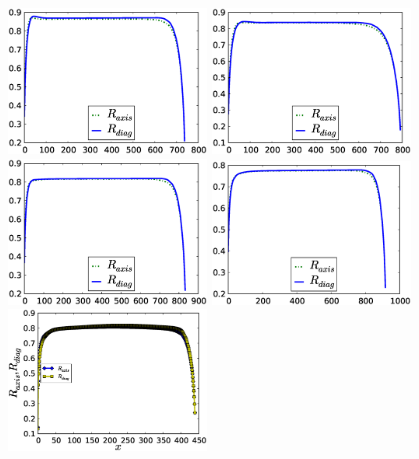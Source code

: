 \documentclass{article}
\begin{document}
\begin{figure}[ht]
\includegraphics[width=0.47\textwidth]{Figures/bubble_length_ca_36.eps}\hfill
\includegraphics[width=0.47\textwidth]{Figures/bubble_length_ca_46.eps}\\
\includegraphics[width=0.47\textwidth]{Figures/bubble_length_ca_61.eps}\hfill
\includegraphics[width=0.47\textwidth]{Figures/bubble_length_ca_88.eps}\\
\includegraphics[width=0.47\textwidth]{Figures/bubble_length_ca_one.eps}

\end{figure}
\end{document}
